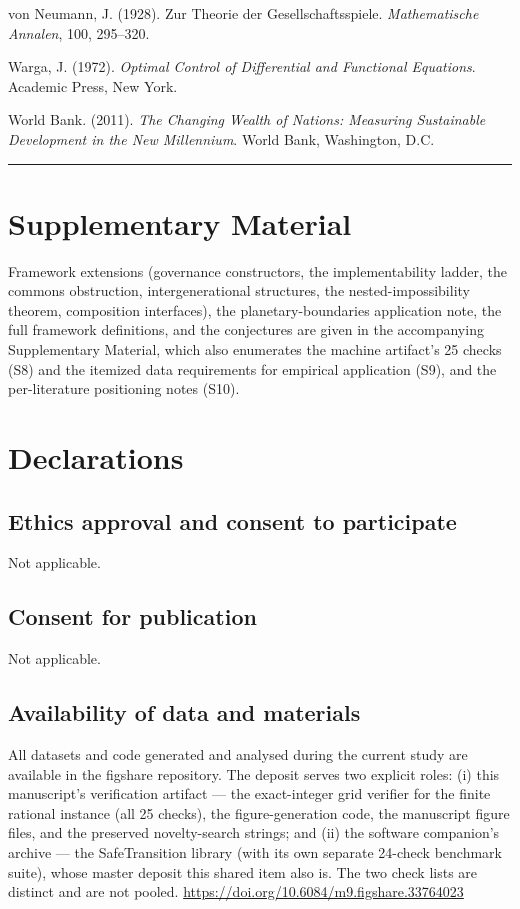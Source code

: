 \documentclass[3p,11pt]{elsarticle}
\begin{document}
von Neumann, J. (1928). Zur Theorie der Gesellschaftsspiele.
\emph{Mathematische Annalen}, 100, 295--320.

Warga, J. (1972). \emph{Optimal Control of Differential and Functional Equations}. Academic Press, New York.

World Bank. (2011). \emph{The Changing Wealth of Nations: Measuring
Sustainable Development in the New Millennium}. World Bank, Washington,
D.C.

\begin{center}\rule{0.5\linewidth}{0.5pt}\end{center}

\section*{Supplementary Material}\label{supplementary-material}

Framework extensions (governance constructors, the implementability ladder, the commons obstruction, intergenerational structures, the nested-impossibility theorem, composition interfaces), the planetary-boundaries application note, the full framework definitions, and the conjectures are given in the accompanying Supplementary Material, which also enumerates the machine artifact's 25 checks (S8) and the itemized data requirements for empirical application (S9), and the per-literature positioning notes (S10).

\section*{Declarations}\label{declarations}

\subsection*{Ethics approval and consent to participate}

Not applicable.

\subsection*{Consent for publication}

Not applicable.

\subsection*{Availability of data and materials}

All datasets and code generated and analysed during the current study are available in the figshare repository. The deposit serves two explicit roles: (i) this manuscript's verification artifact --- the exact-integer grid verifier for the finite rational instance (all 25 checks), the figure-generation code, the manuscript figure files, and the preserved novelty-search strings; and (ii) the software companion's archive --- the SafeTransition library (with its own separate 24-check benchmark suite), whose master deposit this shared item also is. The two check lists are distinct and are not pooled. \url{https://doi.org/10.6084/m9.figshare.33764023}
\end{document}
